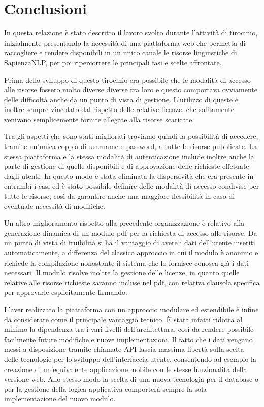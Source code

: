 \chapter{Conclusioni}


In questa relazione è stato descritto il lavoro svolto durante l'attività di
tirocinio, inizialmente presentando la necessità di una piattaforma web che permetta
di raccogliere e rendere disponibili in un unico canale le risorse linguistiche
di SapienzaNLP, per poi ripercorrere le principali fasi e scelte affrontate.

Prima dello sviluppo di questo tirocinio era possibile che le modalità di accesso
alle risorse fossero molto diverse diverse tra loro e questo comportava ovviamente
delle difficoltà anche da un punto di vista di gestione. L'utilizzo di queste
è inoltre sempre vincolato dal rispetto delle relative licenze, che solitamente
venivano semplicemente fornite allegate alla risorse scaricate.

Tra gli aspetti che sono stati migliorati troviamo quindi la possibilità di accedere,
tramite un'unica coppia di username e password, a tutte le risorse pubblicate.
La stessa piattaforma e la stessa modalità di autenticazione include inoltre
anche la parte di gestione di quelle disponibili e di approvazione delle
richieste effetuate dagli utenti. In questo modo è stata eliminata la dispersività
che era presente in entrambi i casi ed è stato possibile definire delle modalità
di accesso condivise per tutte le risorse, così da garantire anche una maggiore
flessibilità in caso di eventuale necessità di modifiche.

Un altro miglioramento rispetto alla precedente organizzazione è relativo alla
generazione dinamica di un modulo pdf per la richiesta di accesso alle risorse.
Da un punto di vista di fruibilità si ha il vantaggio di avere i dati dell'utente
inseriti automaticamente, a differenza del classico approccio in cui il modulo è
anonimo e richiede la compilazione nonostante il sistema che lo fornisce conosca
già i dati necessari.
Il modulo risolve inoltre la gestione delle licenze, in quanto quelle relative
alle risorse richieste saranno incluse nel pdf, con relativa clausola specifica
per approvarle esplicitamente firmando.

L'aver realizzato la piattaforma con un approccio modulare ed estendibile è
infine da considerare come il principale vantaggio tecnico. È stata infatti ridotta al
minimo la dipendenza tra i vari livelli dell'architettura, così da rendere
possibile facilmente future modifiche e nuove implementazioni. Il fatto che i dati
vengano messi a disposizione tramite chiamate API lascia massima libertà sulla
scelta delle tecnologie per lo sviluppo dell'interfaccia utente, consentendo ad
esempio la creazione di un'equivalente applicazione mobile con le stesse
funzionalità della versione web.
Allo stesso modo la scelta di una nuova tecnologia per il database o per la gestione
della logica applicativa comporterà sempre la sola implementazione del nuovo
modulo.

